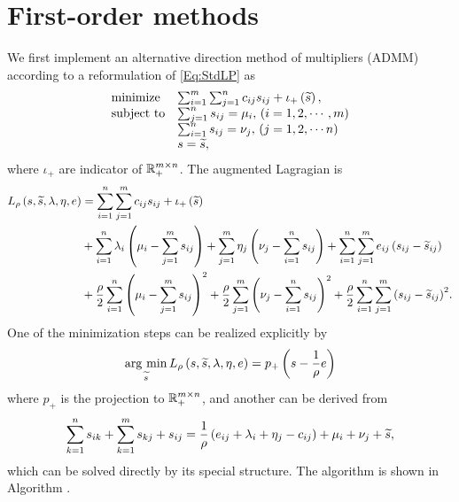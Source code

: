 \documentclass[english]{pkupaper}
\begin{document}
\section{First-order methods} \label{Sec:FOM}

We first implement an alternative direction method of multipliers (ADMM) according to a reformulation of \eqref{Eq:StdLP} as
\begin{equation} \label{Eq:ADMMPrimal}
\begin{array}{ll}
\mathrel{\text{{minimize}}} & \sum_{ {i} = {1} }^{m}{\sum_{ {j} = {1} }^{n}{ c_{ i j } s_{ i j } }} + \iota_+ \left( \widetilde{s} \right), \\
\mathrel{\text{{subject to}}} & \sum_{ {j} = {1} }^{n}{s_{ i j }} = \mu_i, \mathbin{}\left(  i = 1, 2, \cdots, m  \right) \\
& \sum_{ {i} = {1} }^{n}{s_{ i j }} = \nu_j, \mathbin{}\left(  j = 1, 2, \cdots n  \right) \\
& s = \widetilde{s},
\end{array}
\end{equation}
where $\iota_+$ are indicator of $ \mathbb{R}^{ m \times n }_+ $. The augmented Lagragian is
\begin{equation}
\begin{aligned}
L_{\rho} \left(  s, \widetilde{s}, \lambda, \eta, e  \right) &= \sum_{ {i} = {1} }^{n}{\sum_{ {j} = {1} }^{m}{ c_{ i j } s_{ i j } }} + \iota_+ \left( \widetilde{s} \right) \\
&+ \sum_{ {i} = {1} }^{n}{ \lambda_i \left(  \mu_i - \sum_{ {j} = {1} }^{m}{s_{ i j }}  \right) } + \sum_{ {j} = {1} }^{m}{ \eta_j \left(  \nu_j - \sum_{ {i} = {1} }^{n}{s_{ i j }}  \right) } + \sum_{ {i} = {1} }^{n}{\sum_{ {j} = {1} }^{m}{ e_{ i j } \left(  s_{ i j } - \widetilde{s}_{ i j }  \right) }} \\
&+ \frac{\rho}{2} \sum_{ {i} = {1} }^{n}{\left(  \mu_i - \sum_{ {j} = {1} }^{m}{s_{ i j }}  \right)^2} + \frac{\rho}{2} \sum_{ {j} = {1} }^{m}{\left(  \nu_j - \sum_{ {i} = {1} }^{n}{s_{ i j }}  \right)^2} + \frac{\rho}{2} \sum_{ {i} = {1} }^{n}{\sum_{ {j} = {1} }^{m}{\left(  s_{ i j } - \widetilde{s}_{ i j }  \right)^2}}. \\
\end{aligned}
\end{equation}
One of the minimization steps can be realized explicitly by
\begin{gather}
\operatorname*{\arg\,\min}_{\widetilde{s}} L_{\rho} \left(  s, \widetilde{s}, \lambda, \eta, e  \right) = p_+ \left(  s - \frac{1}{\rho} e  \right)
\end{gather}
where $p_+$ is the projection to $ \mathbb{R}^{ m \times n }_+ $, and another can be derived from
\begin{gather} \label{Eq:LinSys}
\sum_{ {k} = {1} }^{n}{s_{ i k }} + \sum_{ {k} = {1} }^{m}{s_{ k j }} + s_{ i j } = \frac{1}{\rho} \left(  e_{ i j } + \lambda_i + \eta_j - c_{ i j }  \right) + \mu_i + \nu_j + \widetilde{s},
\end{gather}
which can be solved directly by its special structure. The algorithm is shown in Algorithm \label{Alg:ADMMPrimal}.
\end{document}

